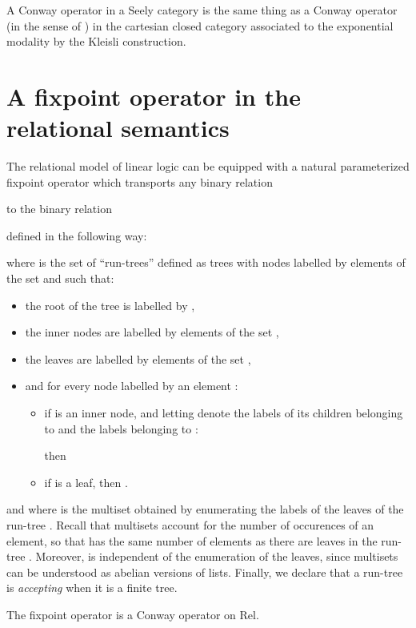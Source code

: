 \documentclass[runningheads,a4paper]{llncs}
\newcommand\red[1]{#1}
\begin{document}
\begin{property}
A Conway operator in a Seely category is the same thing as a Conway operator 
(in the sense of \cite{hasegawa,simpson-plotkin}) in the cartesian closed category
associated to the exponential modality by the Kleisli construction.
\end{property}




\section{A fixpoint operator in the relational semantics}
\label{section/finitary-fixpoint}

\red{
The relational model of linear logic can be equipped 
with a natural parameterized fixpoint operator  which transports any binary relation}

\red{to the binary relation}

defined in the following way:

where  is the set of ``run-trees'' defined as trees
with nodes labelled by elements of the set  and such that:
\begin{itemize}
\item the root of the tree is labelled by ,
\item the inner nodes are labelled by elements of the set ,
\item the leaves are labelled by elements of the set ,
\item and for every node labelled by an element :
\begin{itemize}
\item if  is an inner node, and letting  denote the labels 
of its children belonging to  and  the labels belonging to :

then 

\item if  is a leaf, then .
\end{itemize}
\end{itemize}
and where  is the multiset obtained by enumerating the labels of the leaves of the run-tree . 
Recall that multisets account for the number of occurences of an element, 
so that  has the same number of elements as there are leaves
in the run-tree .
Moreover,  is independent of the enumeration of the leaves, 
since multisets can be understood as abelian versions of lists.
Finally, we declare that a run-tree is \emph{accepting} when it is a finite tree.
\begin{property}
The fixpoint operator  is a Conway operator on Rel.
\end{property}
\end{document}
